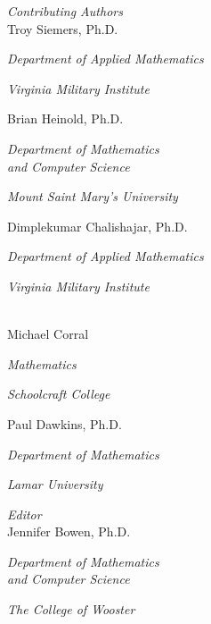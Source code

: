 
\noindent\hspace{-1in}\begin{minipage}[t]{2.5in}
\textit{Contributing Authors}\\

Troy Siemers, Ph.D.

\emph{\small Department of Applied Mathematics}

\emph{\small Virginia Military Institute}\bigskip

Brian Heinold, Ph.D.

\emph{\small Department of Mathematics\\and Computer Science}

\emph{\small Mount Saint Mary's University}\bigskip

Dimplekumar Chalishajar, Ph.D.

\emph{\small Department of Applied Mathematics}

\emph{\small Virginia Military Institute}
\end{minipage}%
\begin{minipage}[t]{2.5in}
\mbox{}\\

Michael Corral

\emph{\small Mathematics}

\emph{\small Schoolcraft College}\bigskip

Paul Dawkins, Ph.D.

\emph{\small Department of Mathematics}

\emph{\small Lamar University}

\end{minipage}

\bigskip\medskip

\noindent\hspace{-1in}\begin{minipage}[t]{2.5in}
\textit{Editor}\\

Jennifer Bowen, Ph.D.

\emph{\small Department of Mathematics\\and Computer Science}

\emph{\small The College of Wooster}
\end{minipage}%
\begin{minipage}[t]{2.5in}
%
%
%
\end{minipage}


